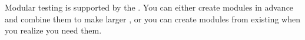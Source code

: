 
 Modular testing is supported by the \ite{}. You can either create modules in advance and combine them to make larger \gdcases{}, or you can create modules from existing \gdcases{} when you realize you need them. 

